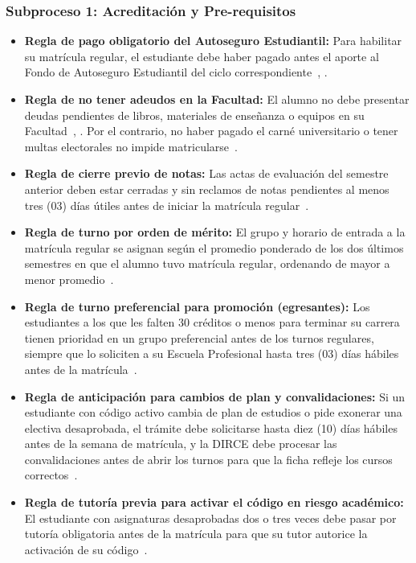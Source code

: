 \subsubsection{Subproceso 1: Acreditación y Pre-requisitos}

\begin{itemize}
    \item \textbf{Regla de pago obligatorio del Autoseguro Estudiantil:} Para habilitar su matrícula regular, el estudiante debe haber pagado antes el aporte al Fondo de Autoseguro Estudiantil del ciclo correspondiente~\cite[Nota~1]{tupa2024}, \cite[nums.~6.1.1 y 6.2]{autoseguro2023}.

    \item \textbf{Regla de no tener adeudos en la Facultad:} El alumno no debe presentar deudas pendientes de libros, materiales de enseñanza o equipos en su Facultad~\cite[Nota~1]{tupa2024}, \cite[Arts.~46\textdegree{} y 47\textdegree{}]{reglamento2022}. Por el contrario, no haber pagado el carné universitario o tener multas electorales no impide matricularse~\cite[Art.~47\textdegree{}, incs.~h e i]{reglamento2022}.

    \item \textbf{Regla de cierre previo de notas:} Las actas de evaluación del semestre anterior deben estar cerradas y sin reclamos de notas pendientes al menos tres (03) días útiles antes de iniciar la matrícula regular~\cite[Art.~6\textdegree{}]{reglamento2022}.

    \item \textbf{Regla de turno por orden de mérito:} El grupo y horario de entrada a la matrícula regular se asignan según el promedio ponderado de los dos últimos semestres en que el alumno tuvo matrícula regular, ordenando de mayor a menor promedio~\cite[Art.~9\textdegree{}, inc.~a; Art.~11\textdegree{}, inc.~m]{reglamento2022}.

    \item \textbf{Regla de turno preferencial para promoción (egresantes):} Los estudiantes a los que les falten 30 créditos o menos para terminar su carrera tienen prioridad en un grupo preferencial antes de los turnos regulares, siempre que lo soliciten a su Escuela Profesional hasta tres (03) días hábiles antes de la matrícula~\cite[Art.~42\textdegree{}]{reglamento2022}.

    \item \textbf{Regla de anticipación para cambios de plan y convalidaciones:} Si un estudiante con código activo cambia de plan de estudios o pide exonerar una electiva desaprobada, el trámite debe solicitarse hasta diez (10) días hábiles antes de la semana de matrícula, y la DIRCE debe procesar las convalidaciones antes de abrir los turnos para que la ficha refleje los cursos correctos~\cite[Arts.~17\textdegree{} y 43\textdegree{}]{reglamento2022}.

    \item \textbf{Regla de tutoría previa para activar el código en riesgo académico:} El estudiante con asignaturas desaprobadas dos o tres veces debe pasar por tutoría obligatoria antes de la matrícula para que su tutor autorice la activación de su código~\cite[Arts.~8\textdegree{} y 48\textdegree{}]{reglamento2022}.
\end{itemize}
